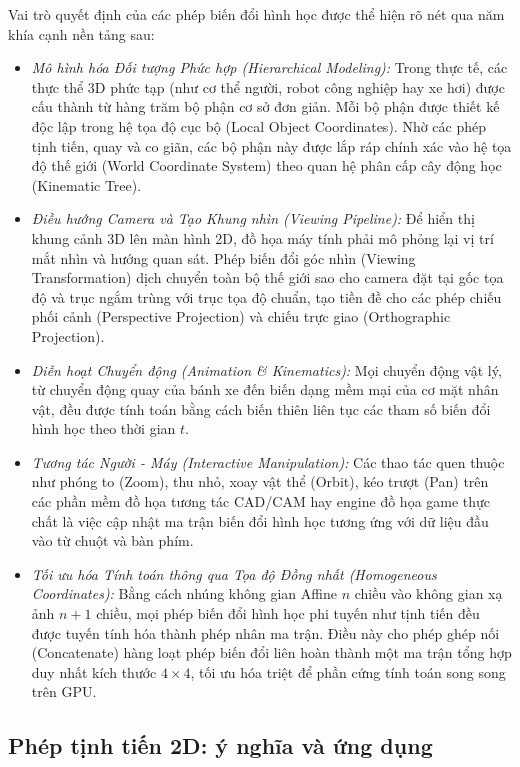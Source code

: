 Vai trò quyết định của các phép biến đổi hình học được thể hiện rõ nét qua năm khía cạnh nền tảng sau:
\begin{itemize}
    \item \textit{Mô hình hóa Đối tượng Phức hợp (Hierarchical Modeling):} Trong thực tế, các thực thể 3D phức tạp (như cơ thể người, robot công nghiệp hay xe hơi) được cấu thành từ hàng trăm bộ phận cơ sở đơn giản. Mỗi bộ phận được thiết kế độc lập trong hệ tọa độ cục bộ (Local Object Coordinates). Nhờ các phép tịnh tiến, quay và co giãn, các bộ phận này được lắp ráp chính xác vào hệ tọa độ thế giới (World Coordinate System) theo quan hệ phân cấp cây động học (Kinematic Tree).
    \item \textit{Điều hướng Camera và Tạo Khung nhìn (Viewing Pipeline):} Để hiển thị khung cảnh 3D lên màn hình 2D, đồ họa máy tính phải mô phỏng lại vị trí mắt nhìn và hướng quan sát. Phép biến đổi góc nhìn (Viewing Transformation) dịch chuyển toàn bộ thế giới sao cho camera đặt tại gốc tọa độ và trục ngắm trùng với trục tọa độ chuẩn, tạo tiền đề cho các phép chiếu phối cảnh (Perspective Projection) và chiếu trực giao (Orthographic Projection).
    \item \textit{Diễn hoạt Chuyển động (Animation \& Kinematics):} Mọi chuyển động vật lý, từ chuyển động quay của bánh xe đến biến dạng mềm mại của cơ mặt nhân vật, đều được tính toán bằng cách biến thiên liên tục các tham số biến đổi hình học theo thời gian $t$.
    \item \textit{Tương tác Người - Máy (Interactive Manipulation):} Các thao tác quen thuộc như phóng to (Zoom), thu nhỏ, xoay vật thể (Orbit), kéo trượt (Pan) trên các phần mềm đồ họa tương tác CAD/CAM hay engine đồ họa game thực chất là việc cập nhật ma trận biến đổi hình học tương ứng với dữ liệu đầu vào từ chuột và bàn phím.
    \item \textit{Tối ưu hóa Tính toán thông qua Tọa độ Đồng nhất (Homogeneous Coordinates):} Bằng cách nhúng không gian Affine $n$ chiều vào không gian xạ ảnh $n+1$ chiều, mọi phép biến đổi hình học phi tuyến như tịnh tiến đều được tuyến tính hóa thành phép nhân ma trận. Điều này cho phép ghép nối (Concatenate) hàng loạt phép biến đổi liên hoàn thành một ma trận tổng hợp duy nhất kích thước $4 \times 4$, tối ưu hóa triệt để phần cứng tính toán song song trên GPU.
\end{itemize}

\subsection{Phép tịnh tiến 2D: ý nghĩa và ứng dụng}
\label{subsec:w6_translation}

